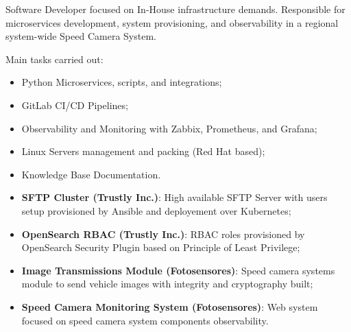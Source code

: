 \documentclass[10pt,a4paper]{altacv}
\begin{document}

Software Developer focused on In-House infrastructure demands. Responsible for microservices development, system provisioning, and observability in a regional system-wide Speed Camera System.

\bigskip

Main tasks carried out:

\bigskip

\begin{itemize}
    \item Python Microservices, scripts, and integrations;
    \item GitLab CI/CD Pipelines;
    \item Observability and Monitoring with Zabbix, Prometheus, and Grafana;
    \item Linux Servers management and packing (Red Hat based);
    \item Knowledge Base Documentation.
\end{itemize}


\begin{itemize}
    \item \textbf{SFTP Cluster (Trustly Inc.)}: High available SFTP Server with users setup provisioned by Ansible and deployement over Kubernetes;
    \item \textbf{OpenSearch RBAC (Trustly Inc.)}: RBAC roles provisioned by OpenSearch Security Plugin based on Principle of Least Privilege;
    \item \textbf{Image Transmissions Module (Fotosensores)}: Speed camera systems module to send vehicle images with integrity and cryptography built;
    \item \textbf{Speed Camera Monitoring System (Fotosensores)}: Web system focused on speed camera system components observability.
\end{itemize}




\clearpage
\end{document}
